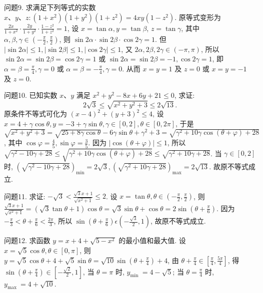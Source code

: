问题9. 求满足下列等式的实数 $x 、 y 、 z:\left(1+x^2\right)\left(1+y^2\right)\left(1+z^2\right)=4 x y\left(1-z^2\right)$.
原等式变形为 $\frac{2 \dot{x}}{1+x^2} \cdot \frac{2 y}{1+y^2} \cdot \frac{1-z^2}{1+z^2}=1$, 设 $x=\tan \alpha, y=\tan \beta$, $z=\tan \gamma$, 其中 $\alpha, \beta, \gamma \in\left(-\frac{\pi}{2}, \frac{\pi}{2}\right)$, 则 $\sin 2 \alpha \cdot \sin 2 \beta \cdot \cos 2 \gamma=1$. 但 $|\sin 2 \alpha| \leqslant 1,|\sin 2 \beta| \leqslant 1,|\cos 2 \gamma| \leqslant 1$, 又 $2 \alpha, 2 \beta, 2 \gamma \in(-\pi, \pi)$, 所以 $\sin 2 \alpha=\sin 2 \beta=\cos 2 \gamma=1$ 或 $\sin 2 \alpha=\sin 2 \beta=-1, \cos 2 \gamma=1$, 即 $\alpha=\beta= \frac{\pi}{4}, \gamma=0$ 或 $\alpha=\beta=-\frac{\pi}{4}, \gamma=0$. 从而 $x=y=1$ 及 $z=0$ 或 $x=y=-1$ 及 $z=0$.



问题10. 已知实数 $x 、 y$ 满足 $x^2+y^2-8 x+6 y+21 \leqslant 0$, 求证:
$$
2 \sqrt{3} \leqslant \sqrt{x^2+y^2+3} \leqslant 2 \sqrt{13} .
$$
原条件不等式可化为 $(x-4)^2+(y+3)^2 \leqslant 4$, 设 $x=4+\gamma \cos \theta, y= -3+\gamma \sin \theta, \gamma \in[0,2], \theta \in[0,2 \pi]$, 于是 $\sqrt{x^2+y^2+3}= \sqrt{25+8 \gamma \cos \theta}-6 \gamma \sin \theta+\gamma^2+3=\sqrt{\gamma^2+10 \gamma \cos (\theta+\varphi)+28}$, 其中 $\cos \varphi= \frac{4}{5}, \sin \varphi=\frac{3}{5}$. 因为 $|\cos (\theta+\varphi)| \leqslant 1$, 所以 $\sqrt{\gamma^2-10 \gamma+28} \leqslant \sqrt{\gamma^2+10 \gamma \cos (\overline{\theta+\varphi})+28} \leqslant \sqrt{\gamma^2+10 \gamma+28}$. 当 $\gamma \in[0,2]$ 时, $\left(\sqrt{\gamma^2-10 \gamma+28}\right)_{\min }=2 \sqrt{3},\left(\sqrt{\gamma^2+10 \gamma+28}\right)_{\max }=2 \sqrt{13}$. 故原不等式成立.



问题11. 求证: $-\sqrt{3}<\frac{\sqrt{3} x+1}{\sqrt{x^2+1}} \leqslant 2$.
设 $x=\tan \theta, \theta \in\left(-\frac{\pi}{2}, \frac{\pi}{2}\right)$, 则 $\frac{\sqrt{3} x+1}{\sqrt{x^2+1}}=(\sqrt{3} \tan \theta+1) \cos \theta= \sqrt{3} \sin \theta+\cos \theta=2 \sin \left(\theta+\frac{\pi}{6}\right)$. 因为 $-\frac{\pi}{3}<\theta+\frac{\pi}{6}<\frac{2 \pi}{3}$, 所以 $\sin \left(\theta+\frac{\pi}{6}\right) \epsilon\left(-\frac{\sqrt{3}}{2}, 1\right)$, 故原不等式成立.



问题12. 求函数 $y=x+4+\sqrt{5-x^2}$ 的最小值和最大值.
设 $x=\sqrt{5} \cos \theta, \theta \in[0, \pi]$, 则 $y=\sqrt{5} \cos \theta+4+\sqrt{5} \sin \theta= \sqrt{10} \sin \left(\theta+\frac{\pi}{4}\right)+4$, 由 $\theta+\frac{\pi}{4} \in\left[\frac{\pi}{4}, \frac{5 \pi}{4}\right]$, 得 $\sin \left(\theta+\frac{\pi}{4}\right) \in\left[-\frac{\sqrt{2}}{2}, 1\right]$, 当 $\theta=\pi$ 时, $y_{\text {min }}=4-\sqrt{5}$; 当 $\theta=\frac{\pi}{4}$ 时, $y_{\text {max }}=4+\sqrt{10}$.



